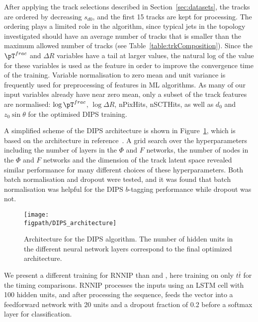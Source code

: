 After applying the track selections described in Section~\ref{sec:datasets}, the tracks are ordered by decreasing $s_{d0}$, and the first 15 tracks are kept for processing. 
The ordering plays a limited role in the algorithm, since typical jets in the topology investigated should have an average number of tracks that is smaller than the maximum allowed number of tracks (see Table~\ref{table:trkComposition}).
Since the $\pT^{frac}$ and $\Delta R$ variables have a tail at larger values, the natural log of the value for these variables is used as the feature in order to improve the convergence time of the training.  
Variable normalisation to zero mean and unit variance is frequently used for preprocessing of features in ML algorithms. 
As many of our input variables already have near zero mean, only a subset of the track features are normalised: $\log \pT^{frac}$, $\log \Delta R$, nPixHits, nSCTHits, as well as $d_0$ and $z_0 \sin \theta$ for the optimised DIPS training.

A simplified scheme of the DIPS architecture is shown in Figure~\ref{fig:architecture}, which is based on the architecture in reference~\cite{Komiske_2019}.  
A grid search over the hyperparameters including the number of layers in the $\Phi$ and $F$ networks, the number of nodes in the $\Phi$ and $F$ networks and the dimension of the track latent space revealed similar performance for many different choices of these hyperparameters. 
Both batch normalisation \cite{DBLP:journals/corr/IoffeS15} and dropout \cite{DBLP:journals/corr/abs-1207-0580} were tested, and it was found that batch normalisation was helpful for the DIPS $b$-tagging performance while dropout was not.

\begin{figure}
  \centering
  \texttt{[image: \\figpath/DIPS\_architecture]}
  \caption{Architecture for the DIPS algorithm. The number of hidden units in the different neural network layers correspond to the final optimized architecture.}
  \label{fig:architecture}
\end{figure}

We present a different training for RNNIP than \cite{ATL-PHYS-PUB-2017-003} and \cite{PFlowPublicPlots2019}, here training on only $t\bar{t}$ for the timing comparisons. RNNIP processes the inputs using an LSTM cell with 100 hidden units, and after processing the sequence, feeds the vector into a feedforward network with 20 units and a dropout fraction of 0.2 before a softmax layer for classification. 

